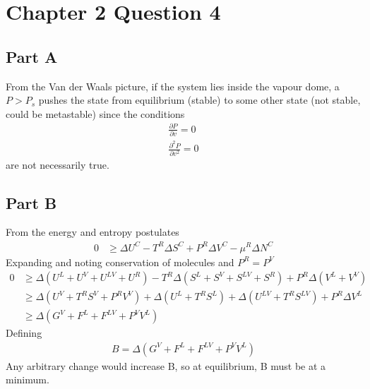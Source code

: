\documentclass{article}
\begin{document}
\section*{Chapter 2 Question 4}
\subsection*{Part A}
From the Van der Waals picture, if the system lies inside the vapour dome, a $P>P_s$ pushes the state from equilibrium (stable) to some other state (not stable, could be metastable) since the conditions
\begin{align*}
\frac{\partial P}{\partial v} = 0\\
\frac{\partial ^2P}{\partial v^2} = 0
\end{align*}
are not necessarily true.

\subsection*{Part B}
From the energy and entropy postulates
\begin{align*}
0&\ge \Delta U^C-T^R\Delta S^C+P^R \Delta V^C-\mu^R \Delta N^C
\end{align*}
Expanding and noting conservation of molecules and $P^R=P^V$
\begin{align*}
0&\ge \Delta (U^L+U^V+U^{LV}+U^R)-T^R\Delta (S^L+S^V+S^{LV}+S^R)+P^R \Delta (V^L+V^V)\\
&\ge \Delta(U^V+T^RS^V+P^RV^V)+\Delta(U^L+T^RS^L)+\Delta(U^{LV}+T^RS^{LV}) +P^R \Delta V^L\\
&\ge \Delta(G^V+F^L+F^{LV}+P^V V^L)
\end{align*}
Defining
\begin{align*}
B=\Delta(G^V+F^L+F^{LV}+P^V V^L)
\end{align*}
Any arbitrary change would increase B, so at equilibrium, B must be at a minimum.
\end{document}
